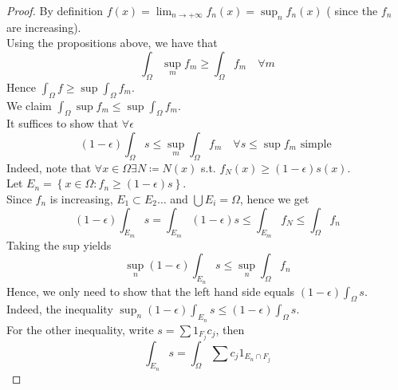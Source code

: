 \documentclass[../main.tex]{subfiles}
\begin{document}
\begin{proof}
By definition $f( x) = \lim_{n \to  + \infty} f_n( x) = \sup_n f_n( x) $ ( since the $f_n$ are increasing).\\
Using the propositions above, we have that
\[ 
\int_{ \Omega }^{  }\sup_m f_m \geq \int_{ \Omega }^{  }f_m \quad \forall m
\]
Hence $ \int_\Omega f \geq \sup \int_{ \Omega }^{  } f_m$.\\
We claim $ \int_{ \Omega }^{  }\sup f_m \leq \sup \int_{ \Omega }^{  }f_m$.\\
It suffices to show that $\forall \epsilon$ 
\[ 
	( 1-\epsilon) \int_{ \Omega }^{  } s \leq \sup_m \int_{ \Omega }^{  }f_m \quad \forall s \leq \sup f_m \text{ simple  } 
\]
Indeed, note that $\forall x \in \Omega\exists N \coloneqq N( x) $ s.t. $f_N( x) \geq ( 1-\epsilon)  s( x)  $.\\
Let $E_n = \left\{ x\in \Omega:f_n \geq ( 1-\epsilon) s \right\} $.\\
Since $ f_n$ is increasing, $E_1 \subset E_2 \ldots$ and $ \bigcup E_i = \Omega$, hence we get
\[ 
	( 1-\epsilon) \int_{ E_m }^{  } s = \int_{ E_m }^{  }( 1-\epsilon) s \leq \int_{ E_m }^{  }f_N \leq \int_{ \Omega }^{  } f_n
\]
Taking the sup yields
\[ 
\sup_n ( 1-\epsilon) \int_{ E_n }^{  }s \leq \sup_n \int_{ \Omega }^{  }f_n
\]
Hence, we only need to show that the left hand side equals $ ( 1-\epsilon) \int_\Omega s$.\\
Indeed, the inequality $\sup_n ( 1-\epsilon) \int_{ E_n }^{  }s \leq  ( 1-\epsilon) \int_{ \Omega }^{  }s$.\\
For the other inequality, write $s= \sum 1_{F_j } c_j $, then 
\[ 
\int_{ E_n }^{  }s = \int_{ \Omega }^{  } \sum c_j 1_{E_n\cap F_j} 
\]




\end{proof}
	
\end{document}
